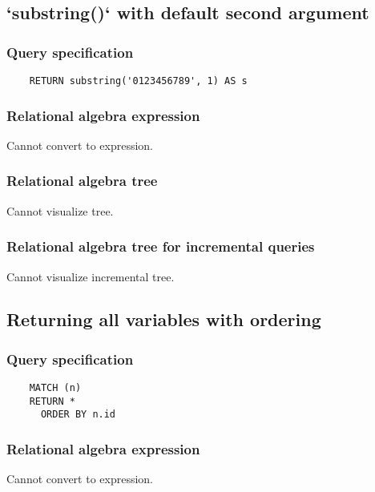 	\subsection{`substring()` with default second argument}

	\subsubsection*{Query specification}

	\begin{lstlisting}
	RETURN substring('0123456789', 1) AS s
	\end{lstlisting}


	\subsubsection*{Relational algebra expression}

	Cannot convert to expression.

	\subsubsection*{Relational algebra tree}

	Cannot visualize tree.

	\subsubsection*{Relational algebra tree for incremental queries}

	Cannot visualize incremental tree.
	\subsection{Returning all variables with ordering}

	\subsubsection*{Query specification}

	\begin{lstlisting}
	MATCH (n)
	RETURN *
	  ORDER BY n.id
	\end{lstlisting}


	\subsubsection*{Relational algebra expression}

	Cannot convert to expression.

